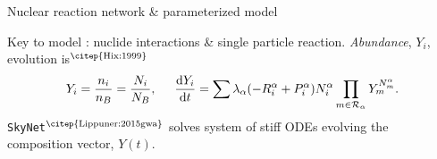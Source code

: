
\begin{frame}{Nuclear reaction network \& parameterized model}

    Key to model \nuc{}: nuclide interactions \& single particle reaction. %
    \textit{Abundance}, $Y_i$, evolution is$^{\text{\citep{Hix:1999}}}$
    \begin{equation*}
    Y_i = \frac{n_i}{n_B} = \frac{N_i}{N_B}, \hspace{5mm}
    \frac{\text{d}Y_i}{\text{d}t} = \sum\lambda_{\alpha}(-R_{i}^{\alpha}+P_{i}^{\alpha})N_{i}^{\alpha}\prod_{m\in\mathcal{R}_{\alpha}}Y_m^{N_{m}^{\alpha}}.
    \end{equation*}
    \texttt{SkyNet}$^{\text{\citep{Lippuner:2015gwa}}}$ solves 
    system of stiff \acp{ODE} %
    evolving the composition vector, $Y(t)$. %
    

\end{frame}
